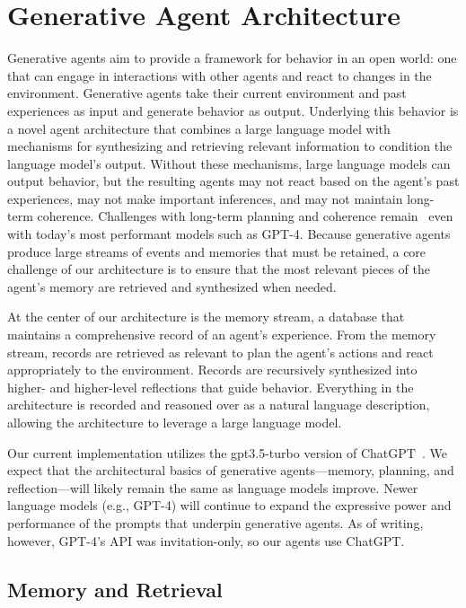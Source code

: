 \section{Generative Agent Architecture}\label{sec:architecture}
Generative agents aim to provide a framework for behavior in an open world: one that can engage in interactions with other agents and react to changes in the environment. Generative agents take their current environment and past experiences as input and generate behavior as output. Underlying this behavior is a novel agent architecture that combines a large language model with mechanisms for synthesizing and retrieving relevant information to condition the language model's output. Without these mechanisms, large language models can output behavior, but the resulting agents may not react based on the agent's past experiences, may not make important inferences, and may not maintain long-term coherence. Challenges with long-term planning and coherence remain~\cite{bubeck2023sparks} even with today's most performant models such as GPT-4. Because generative agents produce large streams of events and memories that must be retained, a core challenge of our architecture is to ensure that the most relevant pieces of the agent's memory are retrieved and synthesized when needed.

At the center of our architecture is the memory stream, a database that maintains a comprehensive record of an agent's experience. From the memory stream, records are retrieved as relevant to plan the agent's actions and react appropriately to the environment. Records are recursively synthesized into higher- and higher-level reflections that guide behavior. Everything in the architecture is recorded and reasoned over as a natural language description, allowing the architecture to leverage a large language model.

Our current implementation utilizes the gpt3.5-turbo version of ChatGPT~\cite{openai_chatgpt}. We expect that the architectural basics of generative agents---memory, planning, and reflection---will likely remain the same as language models improve. Newer language models (e.g., GPT-4) will continue to expand the expressive power and performance of the prompts that underpin generative agents. As of writing, however, GPT-4's API was invitation-only, so our agents use ChatGPT.

\subsection{Memory and Retrieval}


